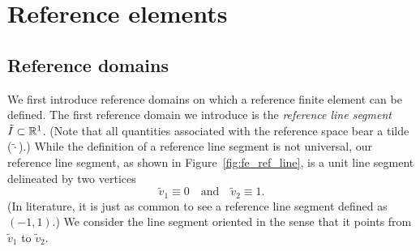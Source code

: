 





\section{Reference elements}
\label{sec:fe_ref_elem}
\subsection{Reference domains}
We first introduce reference domains on which a reference finite element can be defined. The first reference domain we introduce is the \emph{reference line segment} $\tilde I \subset \mathbb{R}^1$. (Note that all quantities associated with the reference space bear a tilde ($\tilde \cdot$).)  While the definition of a reference line segment is not universal, our reference line segment, as shown in Figure~\ref{fig:fe_ref_line}, is a unit line segment delineated by two vertices
\begin{equation*}
  \tilde v_1 \equiv 0 \quad \text{and} \quad \tilde v_2 \equiv 1.
\end{equation*}
(In literature, it is just as common to see a reference line segment defined as $(-1,1)$.)  We consider the line segment oriented in the sense that it points from $\tilde v_1$ to $\tilde v_2$.

